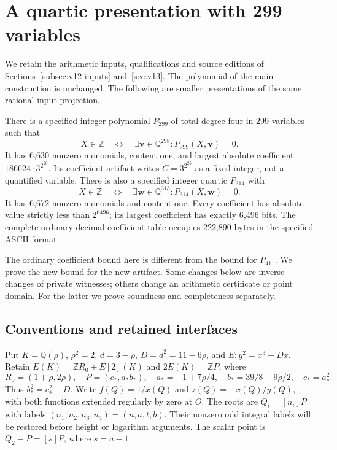 \section{A quartic presentation with 299 variables}\label{sec:v14}

We retain the arithmetic inputs, qualifications and source editions of
Sections~\ref{subsec:v12-inputs} and~\ref{sec:v13}. The polynomial of
the main construction is unchanged. The following are smaller
presentations of the same rational input projection.
\begin{theorem}\label{thm:v14-quartic}
There is a specified integer polynomial $P_{299}$ of total degree four
in 299 variables such that
\[
 X\in\mathbb Z\quad\Longleftrightarrow\quad
 \exists\mathbf v\in\mathbb Q^{298}:P_{299}(X,\mathbf v)=0.
\]
It has 6,630 nonzero monomials, content one, and largest absolute
coefficient $186624\cdot3^{2^{26}}$. Its coefficient artifact writes
$C=3^{2^{25}}$ as a fixed integer, not a quantified variable.
There is also a specified integer quartic $P_{314}$ with
\[
 X\in\mathbb Z\quad\Longleftrightarrow\quad
 \exists\mathbf w\in\mathbb Q^{313}:P_{314}(X,\mathbf w)=0.
\]
It has 6,672 nonzero monomials and content one. Every coefficient has
absolute value strictly less than $2^{6496}$; its largest coefficient
has exactly 6,496 bits. The complete ordinary decimal coefficient table
occupies 222,890 bytes in the specified ASCII format.
\end{theorem}
The ordinary coefficient bound here is different from the bound for
$P_{411}$. We prove the new bound for the new artifact. Some changes
below are inverse changes of private witnesses; others change an
arithmetic certificate or point domain. For the latter we prove
soundness and completeness separately.

\subsection{Conventions and retained interfaces}\label{subsec:v14-inputs}
Put $K=\mathbb Q(\rho)$, $\rho^2=2$, $d=3-\rho$, $D=d^2=11-6\rho$,
and $E:y^2=x^3-Dx$. Retain
$E(K)=\mathbb ZR_0+E[2](K)$ and $2E(K)=\mathbb ZP$, where
\[
 R_0=(1+\rho,2\rho),\quad P=(c_*,a_*b_*),\quad
 a_*=-1+7\rho/4,\quad b_*=39/8-9\rho/2,\quad c_*=a_*^2.
\]
Thus $b_*^2=c_*^2-D$. Write $f(Q)=1/x(Q)$ and
$z(Q)=-x(Q)/y(Q)$, with both functions extended regularly by zero
at $O$. The roots are $Q_i=[n_i]P$ with labels
$(n_1,n_2,n_3,n_4)=(n,a,t,b)$. Their nonzero odd integral labels
will be restored before height or logarithm arguments. The scalar
point is $Q_2-P=[s]P$, where $s=a-1$.

